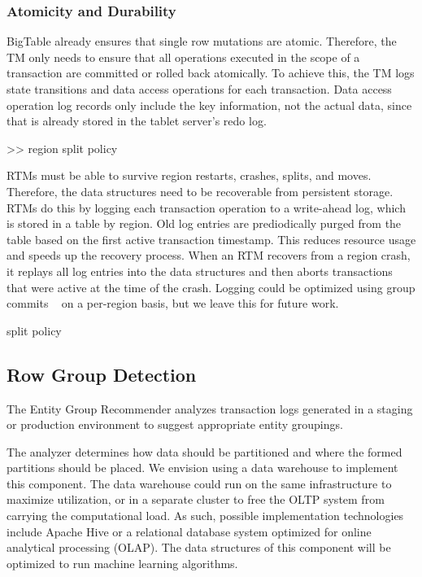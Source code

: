 \documentclass[10pt,final,journal]{IEEEtran}
\begin{document}
\subsubsection{Atomicity and Durability}
BigTable already ensures that single row mutations are atomic. Therefore, the TM only needs to ensure that all operations executed in the scope of a transaction are committed or rolled back atomically. To achieve this, the TM logs state transitions and data access operations for each transaction. Data access operation log records only include the key information, not the actual data, since that is already stored in the tablet server's redo log.


>> region split policy

RTMs must be able to survive region restarts, crashes, splits, and moves. Therefore, the data structures need to be recoverable from persistent storage. RTMs do this by logging each transaction operation to a write-ahead log, which is stored in a table by region. Old log entries are prediodically purged from the table based on the first active transaction timestamp. This reduces resource usage and speeds up the recovery process. When an RTM recovers from a region crash, it replays all log entries into the data structures and then aborts transactions that were active at the time of the crash. Logging could be optimized using group commits ~\cite{Weikum:2001:TIS} on a per-region basis, but we leave this for future work.

split policy


\subsection{Row Group Detection}
The Entity Group Recommender analyzes transaction logs generated in a staging or production environment to suggest appropriate entity groupings.

The analyzer determines how data should be partitioned and where the formed partitions should be placed. We envision using a data warehouse to implement this component. The data warehouse could run on the same infrastructure to maximize utilization, or in a separate cluster to free the OLTP system from carrying the computational load. As such, possible implementation technologies include Apache Hive or a relational database system optimized for online analytical processing (OLAP). The data structures of this component will be optimized to run machine learning algorithms.
\end{document}
